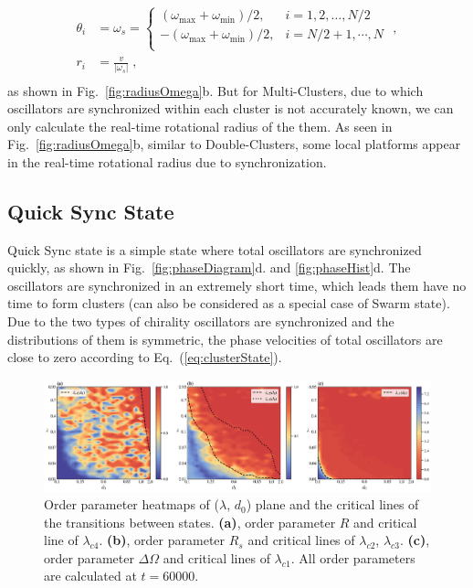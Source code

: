 \documentclass[%
 aip,
 amsmath,amssymb,
 reprint,%
]{revtex4-1}
\begin{document}
\begin{equation}
    \begin{aligned}\label{eq:clusterState2}
        \theta _i&=\omega _s=\begin{cases}
        \left( \omega _{\max}+\omega _{\min} \right) /2,&		i=1,2,\dots ,N/2\\
        -\left( \omega _{\max}+\omega _{\min} \right) /2,&		i=N/2+1,\cdots ,N\\
    \end{cases}\,\,,\\
        r_i&=\frac{v}{\left|\omega _s\right|}\;,\\
    \end{aligned}
\end{equation}
as shown in Fig.~\ref{fig:radiusOmega}b. But for Multi-Clusters, due to which oscillators are synchronized within each cluster is not accurately known, we can only calculate the real-time rotational radius of the them. As seen in Fig.~\ref{fig:radiusOmega}b, similar to Double-Clusters, some local platforms appear in the real-time rotational radius due to synchronization.

\subsection{Quick Sync State}

Quick Sync state is a simple state where total oscillators are synchronized quickly, as shown in Fig.~\ref{fig:phaseDiagram}d. and \ref{fig:phaseHist}d. The oscillators are synchronized in an extremely short time, which leads them have no time to form clusters (can also be considered as a special case of Swarm state). Due to the two types of chirality oscillators are synchronized and the distributions of them is symmetric, the phase velocities of total oscillators are close to zero according to Eq.~(\ref{eq:clusterState}).

\begin{figure}
    \includegraphics[width=\textwidth]{./figs/orderParam.png}
    \caption{
        \label{fig:orderParam} Order parameter heatmaps of ($\lambda$, $d_0$) plane and the critical lines of the transitions between states.
        \textbf{(a)}, order parameter $R$ and critical line of $\lambda_{c4}$.
        \textbf{(b)}, order parameter $R_s$ and critical lines of $\lambda_{c2}$, $\lambda_{c3}$.
        \textbf{(c)}, order parameter $\Delta \Omega$ and critical lines of $\lambda_{c1}$.
        All order parameters are calculated at $t=60000$.
    }
\end{figure}
\end{document}
